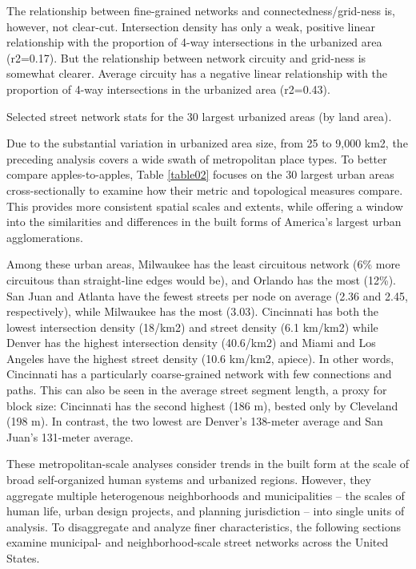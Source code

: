 \documentclass[Afour,sageh,times]{sage/sagej}
\begin{document}
The relationship between fine-grained networks and connectedness/grid-ness is, however, not clear-cut. Intersection density has only a weak, positive linear relationship with the proportion of 4-way intersections in the urbanized area (r2=0.17). But the relationship between network circuity and grid-ness is somewhat clearer. Average circuity has a negative linear relationship with the proportion of 4-way intersections in the urbanized area (r2=0.43).

\begin{table}
\caption{Selected street network stats for the 30 largest urbanized areas (by land area).}
\label{table02}
\end{table}

Due to the substantial variation in urbanized area size, from 25 to 9,000 km2, the preceding analysis covers a wide swath of metropolitan place types. To better compare apples-to-apples, Table \ref{table02} focuses on the 30 largest urban areas cross-sectionally to examine how their metric and topological measures compare. This provides more consistent spatial scales and extents, while offering a window into the similarities and differences in the built forms of America's largest urban agglomerations. 

Among these urban areas, Milwaukee has the least circuitous network (6\% more circuitous than straight-line edges would be), and Orlando has the most (12\%). San Juan and Atlanta have the fewest streets per node on average (2.36 and 2.45, respectively), while Milwaukee has the most (3.03). Cincinnati has both the lowest intersection density (18/km2) and street density (6.1 km/km2) while Denver has the highest intersection density (40.6/km2) and Miami and Los Angeles have the highest street density (10.6 km/km2, apiece). In other words, Cincinnati has a particularly coarse-grained network with few connections and paths. This can also be seen in the average street segment length, a proxy for block size: Cincinnati has the second highest (186 m), bested only by Cleveland (198 m). In contrast, the two lowest are Denver's 138-meter average and San Juan's 131-meter average.

These metropolitan-scale analyses consider trends in the built form at the scale of broad self-organized human systems and urbanized regions. However, they aggregate multiple heterogenous neighborhoods and municipalities – the scales of human life, urban design projects, and planning jurisdiction – into single units of analysis. To disaggregate and analyze finer characteristics, the following sections examine municipal- and neighborhood-scale street networks across the United States.
\end{document}
